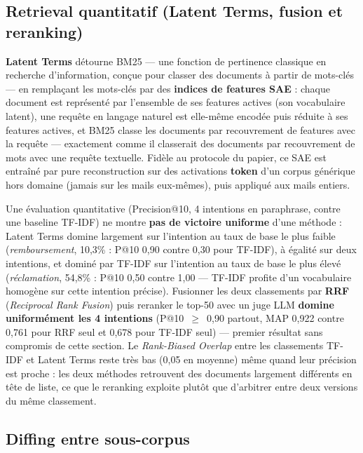 \documentclass[11pt]{article}
\begin{document}
\subsection{Retrieval quantitatif (Latent Terms, fusion et reranking)}

\textbf{Latent Terms} \cite{clavie2026latentterms} détourne BM25 --- une
fonction de pertinence classique en recherche d'information, conçue pour
classer des documents à partir de mots-clés --- en remplaçant les mots-clés
par des \textbf{indices de features SAE} : chaque document est représenté par
l'ensemble de ses features actives (son \og{}vocabulaire latent\fg{}), une
requête en langage naturel est elle-même encodée puis réduite à ses features
actives, et BM25 classe les documents par recouvrement de features avec la
requête --- exactement comme il classerait des documents par recouvrement de
mots avec une requête textuelle. Fidèle au protocole du papier, ce SAE est
entraîné par pure reconstruction sur des activations \textbf{token} d'un
corpus générique hors domaine (jamais sur les mails eux-mêmes), puis appliqué
aux mails entiers.

Une évaluation quantitative (Precision@10, 4 intentions en paraphrase, contre
une baseline TF-IDF) ne montre \textbf{pas de victoire uniforme} d'une
méthode : Latent Terms domine largement sur l'intention au taux de base le
plus faible (\emph{remboursement}, 10,3\% : P@10 0,90 contre 0,30 pour
TF-IDF), à égalité sur deux intentions, et dominé par TF-IDF sur l'intention
au taux de base le plus élevé (\emph{réclamation}, 54,8\% : P@10 0,50 contre
1,00 --- TF-IDF profite d'un vocabulaire homogène sur cette intention
précise). Fusionner les deux classements par \textbf{RRF} (\emph{Reciprocal
Rank Fusion}) puis reranker le top-50 avec un juge LLM \textbf{domine
uniformément les 4 intentions} (P@10~$\geq$~0,90 partout, MAP 0,922 contre
0,761 pour RRF seul et 0,678 pour TF-IDF seul) --- premier résultat sans
compromis de cette section. Le \emph{Rank-Biased Overlap} entre les
classements TF-IDF et Latent Terms reste très bas (0,05 en moyenne) même
quand leur précision est proche : les deux méthodes retrouvent des documents
largement différents en tête de liste, ce que le reranking exploite plutôt
que d'arbitrer entre deux versions du même classement.

\subsection{Diffing entre sous-corpus}
\label{subsec:diffing}
\end{document}
